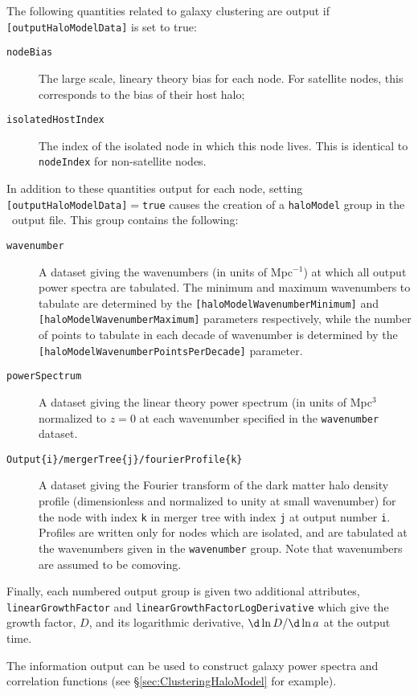 The following quantities related to galaxy clustering are output if {\tt [outputHaloModelData]} is set to true:
\begin{description}
 \item [{\tt nodeBias}] The large scale, lineary theory bias for each node. For satellite nodes, this corresponds to the bias of their host halo;
 \item [{\tt isolatedHostIndex}] The index of the isolated node in which this node lives. This is identical to {\tt nodeIndex} for non-satellite nodes.
\end{description}
In addition to these quantities output for each node, setting {\tt [outputHaloModelData]}$=${\tt true} causes the creation of a {\tt haloModel} group in the \glc\ output file. This group contains the following:
\begin{description}
 \item [{\tt wavenumber}] A dataset giving the wavenumbers (in units of Mpc$^{-1}$) at which all output power spectra are tabulated. The minimum and maximum wavenumbers to tabulate are determined by the {\tt [haloModelWavenumberMinimum]} and {\tt [haloModelWavenumberMaximum]} parameters respectively, while the number of points to tabulate in each decade of wavenumber is determined by the {\tt [haloModelWavenumberPointsPerDecade]} parameter.
 \item [{\tt powerSpectrum}] A dataset giving the linear theory power spectrum (in units of Mpc$^3$ normalized to $z=0$ at each wavenumber specified in the {\tt wavenumber} dataset.
 \item [{\tt Output\{i\}/mergerTree\{j\}/fourierProfile\{k\}}] A dataset giving the Fourier transform of the dark matter halo density profile (dimensionless and normalized to unity at small wavenumber) for the node with index {\tt k} in merger tree with index {\tt j} at output number {\tt i}. Profiles are written only for nodes which are isolated, and are tabulated at the wavenumbers given in the {\tt wavenumber} group. Note that wavenumbers are assumed to be comoving.
\end{description}
Finally, each numbered output group is given two additional attributes, {\tt linearGrowthFactor} and {\tt linearGrowthFactorLogDerivative} which give the growth factor, $D$, and its logarithmic derivative, $\d \ln D / \d \ln a$ at the output time.

The information output can be used to construct galaxy power spectra and correlation functions (see \S\ref{sec:ClusteringHaloModel} for example).

